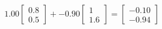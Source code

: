 \documentclass[preview]{standalone}
\begin{document}
\begin{align*}
1.00 \begin{bmatrix} 0.8 \\ 0.5 \end{bmatrix} + -0.90 \begin{bmatrix} 1 \\ 1.6 \end{bmatrix} = \begin{bmatrix} -0.10 \\ -0.94 \end{bmatrix}
\end{align*}
\end{document}
